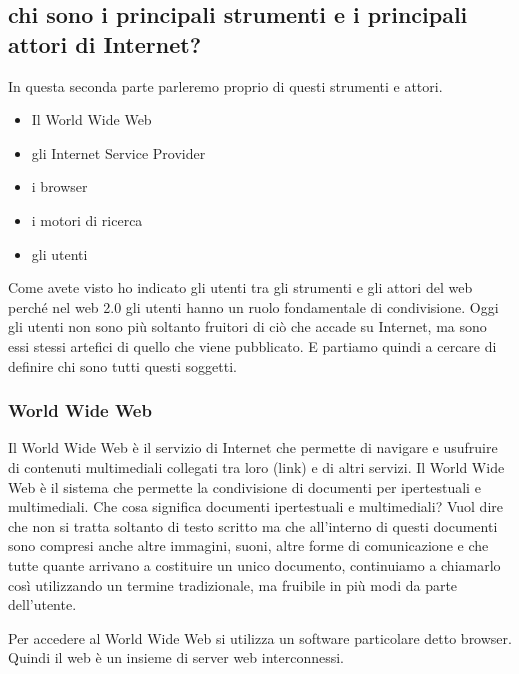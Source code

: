 \subsection{chi sono i principali strumenti e i principali attori di Internet?}

In questa seconda parte parleremo proprio di questi strumenti e attori. \par
\begin{itemize}
    \item Il World Wide Web
    \item gli Internet Service Provider
    \item i browser
    \item i motori di ricerca
    \item gli utenti
\end{itemize}

Come avete visto ho indicato gli utenti tra gli strumenti e gli attori del web perché nel web 2.0 gli utenti hanno un ruolo fondamentale di condivisione. Oggi gli utenti non sono più soltanto fruitori di ciò che accade su Internet, ma sono essi stessi artefici di quello che viene pubblicato. E partiamo quindi a cercare di definire chi sono tutti questi soggetti.
\subsubsection{World Wide Web}
Il  World Wide Web è il servizio di Internet che permette di navigare e usufruire di contenuti multimediali collegati tra loro (link) e di altri servizi. Il World Wide Web è il sistema che permette la condivisione di documenti per ipertestuali e multimediali. Che cosa significa documenti ipertestuali e multimediali? Vuol dire che non si tratta soltanto di testo scritto ma che all'interno di questi documenti sono compresi anche altre immagini, suoni, altre forme di comunicazione e che tutte quante arrivano a costituire un unico documento, continuiamo a chiamarlo così utilizzando un termine tradizionale, ma fruibile in più modi da parte dell'utente.\par

Per accedere al World Wide Web si utilizza un software particolare detto browser. Quindi il web è un insieme di server web interconnessi.
